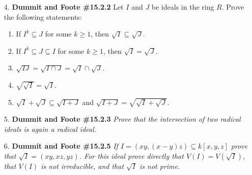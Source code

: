 \documentclass[12pt]{article}
\begin{document}
\begin{enumerate}
\item[4.] \textbf{Dummit and Foote \#15.2.2} Let $I$ and $J$ be ideals in the ring $R$. Prove the following statements:
\begin{enumerate}
\item If $I^k\subseteq J$ for some $k\ge 1$, then $\sqrt{I}\subseteq\sqrt{J}$.
\item If $I^k\subseteq J\subseteq I$ for some $k\ge 1$, then $\sqrt{I}=\sqrt{J}$.
\item $\sqrt{IJ} = \sqrt{I\cap J} = \sqrt{I}\cap\sqrt{J}$.
\item $\sqrt{\sqrt{I}} = \sqrt{I}$.
\item $\sqrt{I}+\sqrt{J} \subseteq \sqrt{I+J}$ and $\sqrt{I+J} = \sqrt{\sqrt{I}+\sqrt{J}}$.
\end{enumerate}

\item[5.] \textbf{Dummit and Foote \#15.2.3} \textit{Prove that the intersection of two radical ideals is again a radical ideal.}

\item[6.] \textbf{Dummit and Foote \#15.2.5} \textit{If $I = (xy, (x - y)z) \subseteq k[x, y, z]$ prove that $\sqrt{I} = (xy, xz, yz)$. For this ideal prove
\emph{directly} that $V(I) = V(\sqrt{I})$, that $V(I)$ is not irreducible, and that $\sqrt{I}$ is not prime.}

\end{enumerate}
\end{document}
